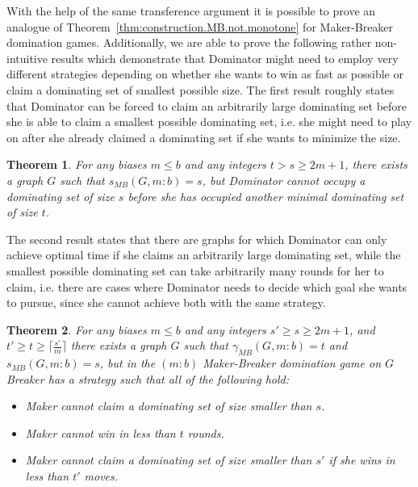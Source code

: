 \documentclass[reqno, 12pt]{amsart}
\numberwithin{equation}{section}
\numberwithin{figure}{section}
\newtheorem{theorem}{Theorem}
\begin{document}
With the help of the same transference argument it is possible to prove an analogue of Theorem~\ref{thm:construction.MB.not.monotone} for Maker-Breaker domination games. Additionally, we are able to prove the following rather non-intuitive results which demonstrate that Dominator might need to employ very different strategies depending on whether she wants to win as fast as possible or claim a dominating set of smallest possible size.
The first result roughly states that 
Dominator can be forced to claim an arbitrarily large 
dominating set before she is able to claim a smallest possible
dominating set, i.e. she might need to play on after she already claimed a dominating set if she wants to minimize the size.

\begin{theorem}
\label{thm:construction.large.before.small}
For any biases $m \leq b$ and any integers $t> s \geq 2m + 1$,
there exists a graph $G$ such that
$s_{MB}(G,m:b)=s$, but Dominator cannot occupy
a dominating set of size $s$ before she has  
occupied another minimal dominating set of size $t$.
\end{theorem}

The second result states that there are graphs for which Dominator can only achieve optimal time if she claims an arbitrarily large dominating set, while the smallest possible dominating set can take arbitrarily many rounds for her to claim, i.e. there are cases where Dominator needs to decide which goal she wants to pursue, since she cannot achieve both with the same strategy.

\begin{theorem}
\label{thm:construction.large.faster.than.small}
For any biases $m \leq b$ and any integers 
$s'\geq s\geq 2m + 1$, and $t' \geq t \geq \lceil\frac{s'}{m}\rceil$
there exists a graph $G$ such that
$\gamma_{MB}(G,m:b)=t$ and $s_{MB}(G,m:b)=s$, but
in the $(m:b)$ Maker-Breaker domination game on $G$ Breaker has a strategy such that all of the following hold:
\begin{itemize}
 \item Maker cannot claim a dominating set of size smaller than $s$.
 \item Maker cannot win in less than $t$ rounds.
 \item Maker cannot claim a dominating set of size smaller than $s'$ if she wins in less than $t'$ moves.
\end{itemize}
\end{theorem}


\medskip
\end{document}
